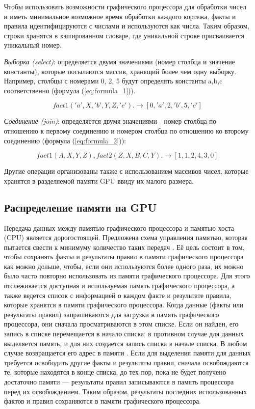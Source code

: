 Чтобы использовать возможности графического процессора для обработки чисел и иметь минимальное возможное время обработки каждого кортежа, факты и правила идентифицируются с числами и используются как числа. Таким образом, строки хранятся в хэшированном словаре, где уникальной строке присваивается уникальный номер. 


\textit{Выборка (select)}: определяется двумя значениями (номер столбца и значение константы), которые посылаются  массив, хранящий более чем одну выборку. Например, столбцы с номерами 0, 2, 5 будут определять константы a,b,c соответственно (формула (\ref{eq:formula_1})).

\begin{equation}
	\label{eq:formula_1}
	fact1('a', X, 'b', Y, Z, 'c'). \rightarrow [0, 'a', 2, 'b', 5, 'c']
\end{equation}


\textit{Соединение (join)}: определяется двумя значениями - номер столбца по отношению к первому соединению и номером столбца по отношению ко второму соединению (формула (\ref{eq:formula_2})):

\begin{equation}
	\label{eq:formula_2}
	fact1(A, X, Y, Z), fact2(Z, X, B, C, Y). \rightarrow [1, 1, 2, 4, 3, 0]
\end{equation}


Другие операции организованы также с использованием массивов чисел, которые хранятся в разделяемой памяти GPU ввиду их малого размера.

\subsection{Распределение памяти на GPU}
Передача данных между памятью графического процессора и памятью хоста (CPU) является дорогостоящей. Предложена схема управления памятью, которая пытается свести к минимуму количество таких передач \cite{gpu_datalog}. Её цель состоит в том, чтобы сохранять факты и результаты правил в памяти графического процессора как можно дольше, чтобы, если они используются более одного раза, их можно было часто повторно использовать из памяти графического процессора. Для этого отслеживается доступная и используемая память графического процессора, а также ведется список с информацией о каждом факте и результате правила, которые хранятся в памяти графического процессора. Когда данные (факты или результаты правил) запрашиваются для загрузки в память графического процессора, они сначала
просматриваются в этом списке. Если он найден, его запись в списке перемещается в начало списка; в противном случае для данных выделяется память, и для них создается запись списка в начале списка. В любом случае возвращается его адрес в памяти . Если для выделения памяти для данных требуется освободить другие факты и результаты правил, сначала освобождаются те, которые находятся в конце списка, до тех пор, пока не будет получено достаточно памяти — результаты правил записываются в память процессора перед их освобождением. Таким образом, результаты последних использованных фактов и правил сохраняются в памяти графического процессора.

